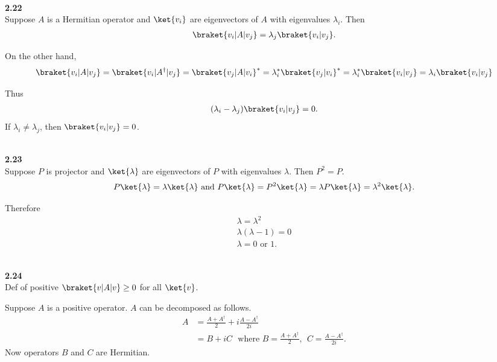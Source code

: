 \documentclass[10pt]{book}
\newcommand{\Textbf}[1]{\hspace{3mm}\\ \textbf{#1}\\}
\begin{document}
	\Textbf{2.22}
	
	Suppose $A$ is a Hermitian operator and $\ket{v_i}$ are eigenvectors of $A$ with eigenvalues $\lambda_i$.
	Then
	\begin{equation}
\begin{aligned}
		\braket{v_i | A | v_j} = \lambda_j \braket{v_i | v_j}.
	\end{aligned}
\end{equation}
	
	On the other hand,
	\begin{equation}
\begin{aligned}
		\braket{v_i | A | v_j} = \braket{v_i | A^\dagger | v_j}
		= \braket{v_j | A | v_i}^*
		= \lambda_i^* \braket{v_j | v_i}^*
		=  \lambda_i^* \braket{v_i | v_j}
		=  \lambda_i \braket{v_i | v_j}
	\end{aligned}
\end{equation}
	
	Thus
	\begin{equation}
\begin{aligned}
		(\lambda_i - \lambda_j) \braket{v_i | v_j}  = 0.
	\end{aligned}
\end{equation}
	If $\lambda_i \neq \lambda_j$, then $\braket{v_i | v_j}  = 0$.
	
	
	\Textbf{2.23}
	
	Suppose $P$ is projector and $\ket{\lambda}$  are eigenvectors of $P$ with eigenvalues $\lambda$.
	Then $P^2 = P$.
	\begin{equation}
\begin{aligned}
		P \ket{\lambda} = \lambda \ket{\lambda} \text{ and }	P \ket{\lambda} = P^2 \ket{\lambda} = \lambda  P \ket{\lambda} = \lambda^2 \ket{\lambda}.
	\end{aligned}
\end{equation}
	
	Therefore
	\begin{equation}
\begin{aligned}
		\lambda = \lambda^2\\
		\lambda (\lambda - 1) = 0\\
		\lambda = 0 \text{ or } 1.
	\end{aligned}
\end{equation}
	
	
	\Textbf{2.24}
	
	Def of positive $\braket{v | A | v} \geq 0$ for all $\ket{v}$.
	
	Suppose $A$ is a positive operator. $A$ can be decomposed as follows.
	\begin{equation}
\begin{aligned}
		A &= \frac{A + A^\dagger}{2} + i \frac{A - A^\dagger}{2i}\\
		&= B + i C  ~~~\text{where } B =\frac{A + A^\dagger}{2}, ~~  C = \frac{A - A^\dagger}{2i}.
	\end{aligned}
\end{equation}
	Now operators $B$ and $C$ are Hermitian.
	
\end{document}
